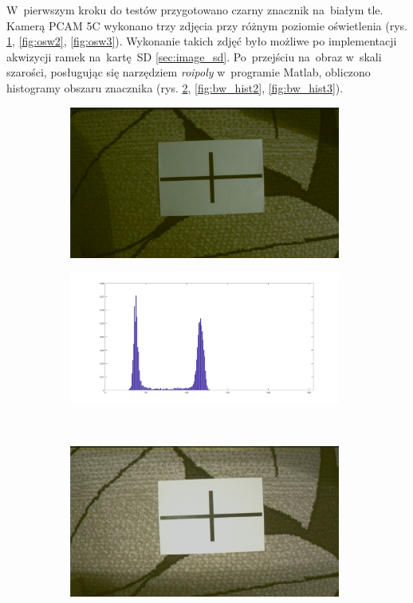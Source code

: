 W~pierwszym kroku do testów przygotowano czarny znacznik na~białym tle. 
Kamerą PCAM 5C wykonano trzy zdjęcia przy różnym poziomie oświetlenia (rys. \ref{fig:osw1}, \ref{fig:osw2}, \ref{fig:osw3}). 
Wykonanie takich zdjęć było możliwe po implementacji akwizycji ramek na~kartę~SD \ref{sec:image_sd}. 
Po~przejściu na~obraz w~skali szarości, posługując się narzędziem \textit{roipoly} w~programie Matlab, obliczono histogramy obszaru znacznika (rys. \ref{fig:bw_hist1}, \ref{fig:bw_hist2}, \ref{fig:bw_hist3}).\\
\begin{figure}
	\centering
	\begin{subfigure}{0.4\textwidth}
		\centering
		\includegraphics[width=0.98\textwidth]{rgb_ciemny.jpg}
		\caption{}
		\label{fig:osw1}
	\end{subfigure}%
	\begin{subfigure}{0.55\textwidth}
		\centering
		\includegraphics[width=0.98\textwidth]{bw_hist1.jpg}
		\caption{}
		\label{fig:bw_hist1}
	\end{subfigure}\\
	\begin{subfigure}{0.4\textwidth}
		\centering
		\includegraphics[width=0.98\textwidth]{rgb_sredni.jpg}

\end{subfigure}
\end{figure}
